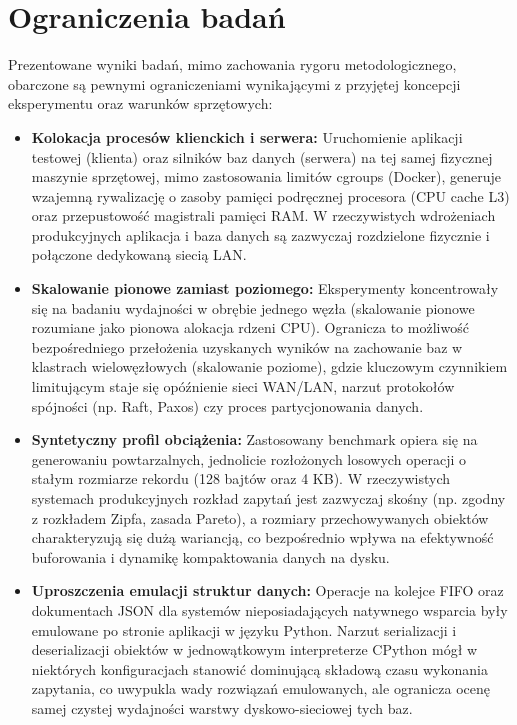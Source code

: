 \section{Ograniczenia badań}
Prezentowane wyniki badań, mimo zachowania rygoru metodologicznego, obarczone są pewnymi ograniczeniami wynikającymi z przyjętej koncepcji eksperymentu oraz warunków sprzętowych:
\begin{itemize}
    \item \textbf{Kolokacja procesów klienckich i serwera:} Uruchomienie aplikacji testowej (klienta) oraz silników baz danych (serwera) na tej samej fizycznej maszynie sprzętowej, mimo zastosowania limitów cgroups (Docker), generuje wzajemną rywalizację o zasoby pamięci podręcznej procesora (CPU cache L3) oraz przepustowość magistrali pamięci RAM. W rzeczywistych wdrożeniach produkcyjnych aplikacja i baza danych są zazwyczaj rozdzielone fizycznie i połączone dedykowaną siecią LAN.
    \item \textbf{Skalowanie pionowe zamiast poziomego:} Eksperymenty koncentrowały się na badaniu wydajności w obrębie jednego węzła (skalowanie pionowe rozumiane jako pionowa alokacja rdzeni CPU). Ogranicza to możliwość bezpośredniego przełożenia uzyskanych wyników na zachowanie baz w klastrach wielowęzłowych (skalowanie poziome), gdzie kluczowym czynnikiem limitującym staje się opóźnienie sieci WAN/LAN, narzut protokołów spójności (np. Raft, Paxos) czy proces partycjonowania danych.
    \item \textbf{Syntetyczny profil obciążenia:} Zastosowany benchmark opiera się na generowaniu powtarzalnych, jednolicie rozłożonych losowych operacji o stałym rozmiarze rekordu (128 bajtów oraz 4 KB). W rzeczywistych systemach produkcyjnych rozkład zapytań jest zazwyczaj skośny (np. zgodny z rozkładem Zipfa, zasada Pareto), a rozmiary przechowywanych obiektów charakteryzują się dużą wariancją, co bezpośrednio wpływa na efektywność buforowania i dynamikę kompaktowania danych na dysku.
    \item \textbf{Uproszczenia emulacji struktur danych:} Operacje na kolejce FIFO oraz dokumentach JSON dla systemów nieposiadających natywnego wsparcia były emulowane po stronie aplikacji w języku Python. Narzut serializacji i deserializacji obiektów w jednowątkowym interpreterze CPython mógł w niektórych konfiguracjach stanowić dominującą składową czasu wykonania zapytania, co uwypukla wady rozwiązań emulowanych, ale ogranicza ocenę samej czystej wydajności warstwy dyskowo-sieciowej tych baz.
\end{itemize}
